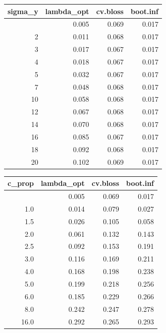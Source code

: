 \documentclass[
  letterpaper,
  DIV=11,
  numbers=noendperiod]{scrartcl}
\newcounter{none} %
\begin{document}
\begin{figure}

\begin{minipage}[t]{0.50\linewidth}

{\def\LTcaptype{none} %
\begin{longtable}[]{@{}rrrr@{}}
\toprule\noalign{}
sigma\_y & lambda\_opt & cv.bloss & boot.inf \\
\midrule\noalign{}
\endhead
\bottomrule\noalign{}
\endlastfoot
1 & 0.005 & 0.069 & 0.017 \\
2 & 0.011 & 0.068 & 0.017 \\
3 & 0.017 & 0.067 & 0.017 \\
4 & 0.018 & 0.067 & 0.017 \\
5 & 0.032 & 0.067 & 0.017 \\
7 & 0.048 & 0.068 & 0.017 \\
10 & 0.058 & 0.068 & 0.017 \\
12 & 0.067 & 0.068 & 0.017 \\
14 & 0.070 & 0.068 & 0.017 \\
16 & 0.085 & 0.067 & 0.017 \\
18 & 0.092 & 0.068 & 0.017 \\
20 & 0.102 & 0.069 & 0.017 \\
\end{longtable}
}

\end{minipage}%
%
\begin{minipage}[t]{0.50\linewidth}

{\def\LTcaptype{none} %
\begin{longtable}[]{@{}rrrr@{}}
\toprule\noalign{}
c\_prop & lambda\_opt & cv.bloss & boot.inf \\
\midrule\noalign{}
\endhead
\bottomrule\noalign{}
\endlastfoot
0.7 & 0.005 & 0.069 & 0.017 \\
1.0 & 0.014 & 0.079 & 0.027 \\
1.5 & 0.026 & 0.105 & 0.058 \\
2.0 & 0.061 & 0.132 & 0.143 \\
2.5 & 0.092 & 0.153 & 0.191 \\
3.0 & 0.116 & 0.169 & 0.211 \\
4.0 & 0.168 & 0.198 & 0.238 \\
5.0 & 0.199 & 0.218 & 0.256 \\
6.0 & 0.185 & 0.229 & 0.266 \\
8.0 & 0.242 & 0.247 & 0.278 \\
16.0 & 0.292 & 0.265 & 0.293 \\
\end{longtable}
}

\end{minipage}%

\end{figure}%
\end{document}
